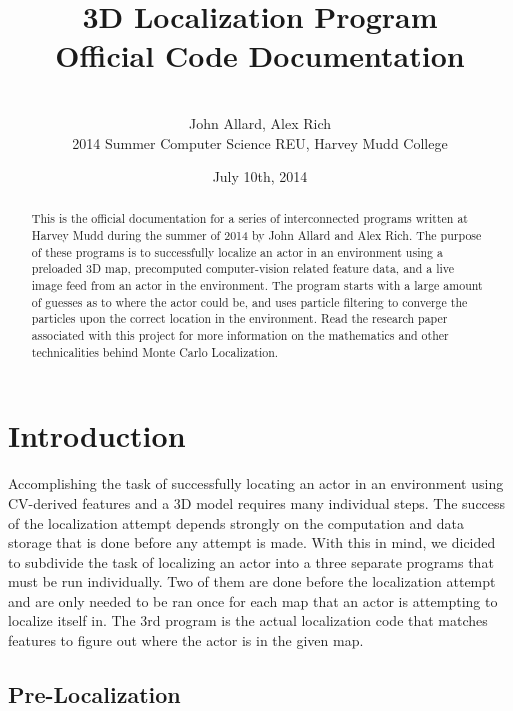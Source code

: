 \documentclass[a4paper,11pt]{article}
\title{3D Localization Program \\ Official Code Documentation}
\author{ \\[7in]  John Allard, Alex Rich \\ 2014 Summer Computer Science REU, Harvey Mudd College}
\date{July 10th, 2014}
\begin{document}
  \maketitle
  \newpage

    \tableofcontents
    \newpage

    \begin{abstract}
    This is the official documentation for a series of interconnected programs written at Harvey Mudd during the summer of 2014 by John Allard and Alex Rich. The purpose of these programs is to successfully localize an actor in an environment using a preloaded 3D map, precomputed computer-vision related feature data, and a live image feed from an actor in the environment. The program starts with a large amount of guesses as to where the actor could be, and uses particle filtering to converge the particles upon the correct location in the environment. Read the research paper associated with this project for more information on the mathematics and other technicalities behind Monte Carlo Localization.
    \end{abstract}

    \section{Introduction}
    Accomplishing the task of successfully locating an actor in an environment using CV-derived features and a 3D model requires many individual steps. The success of the localization attempt depends strongly on the computation and data storage that is done before any attempt is made. With this in mind, we dicided to subdivide the task of localizing an actor into a three separate programs that must be run individually. Two of them are done before the localization attempt and are only needed to be ran once for each map that an actor is attempting to localize itself in. The 3rd program is the actual localization code that matches features to figure out where the actor is in the given map.

        \subsection{Pre-Localization}
\end{document}
